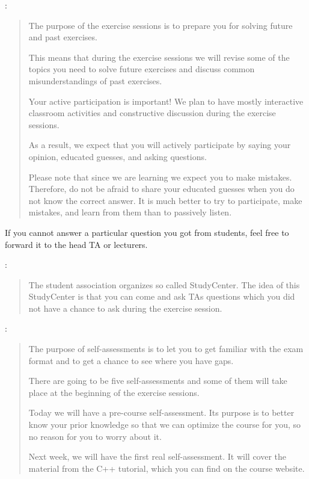 \quest


:
\begin{quote}
    The purpose of the exercise sessions is to prepare you for solving
    future and past exercises.

    This means that during the exercise sessions we will revise some of
    the topics you need to solve future exercises and discuss common
    misunderstandings of past exercises.

    Your active participation is important! We plan to have mostly
    interactive classroom activities and constructive discussion during
    the exercise sessions.

    As a result, we expect that you will actively participate by saying
    your opinion, educated guesses, and asking questions.

    Please note that since we are learning we expect you to make
    mistakes. Therefore, do not be afraid to share your educated guesses
    when you do not know the correct answer. It is much better to try to
    participate, make mistakes, and learn from them than to passively
    listen.
\end{quote}

\quest

\begin{Explanation}
    If you cannot answer a particular question you got from students,
    feel free to forward it to the head TA or lecturers.
\end{Explanation}


:
\begin{quote}
    The student association organizes so called StudyCenter. The idea of
    this StudyCenter is that you can come and ask TAs questions which
    you did not have a chance to ask during the exercise session.
\end{quote}

\quest


:
\begin{quote}
    The purpose of self-assessments is to let you to get familiar with
    the exam format and to get a chance to see where you have gaps.

    There are going to be five self-assessments and some of them will
    take place at the beginning of the exercise sessions.

    Today we will have a pre-course self-assessment. Its purpose is to
    better know your prior knowledge so that we can optimize the course
    for you, so no reason for you to worry about it.

    Next week, we will have the first real self-assessment. It will
    cover the material from the C++ tutorial, which you can find on the
    course website.
\end{quote}

